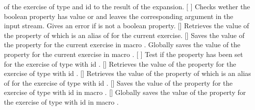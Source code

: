 \documentclass{xsim-manual}
\begin{document}
\begin{commands}
     of the exercise of type  and id  to
    the result of the expansion.
  \expandable{}[%
    ]
    Checks wether the boolean property  has value 
    or  and leaves the corresponding argument in the input
    stream.  Gives an error if  is not a boolean property.
  \expandable{}[]
    Retrieves the value of the property of which  is an alias
    of for the current exercise.
  []
    Saves the value of the property  for the current
    exercise in macro .
    Globally saves the value of the property  for the current
    exercise in macro .
  [%
    ]
    Test if the property  has been set for the exercise of type
     with id .
  \expandable{}[]
    Retrieves the value of the property  for the exercise of type
     with id .
  \expandable{}[]
    Retrieves the value of the property of which  is an alias
    of for the exercise of type  with id .
  []
    Saves the value of the property  for the exercise of type
     with id  in macro .
  []
    Globally saves the value of the property  for the exercise
    of type  with id  in macro .
\end{commands}
\end{document}
